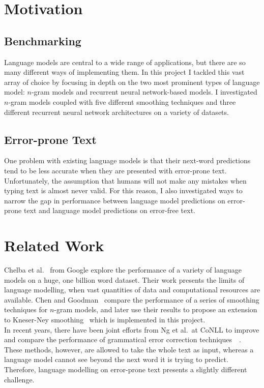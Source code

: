 \documentclass[a4paper, 12pt]{report}
\begin{document}
\section{Motivation}

\subsection*{Benchmarking}

Language models are central to a wide range of applications, but there are so many different ways of implementing them. In this project I tackled this vast array of choice by focusing in depth on the two most prominent types of language model: $n$-gram models and recurrent neural network-based models. I investigated $n$-gram models coupled with five different smoothing techniques and three different recurrent neural network architectures on a variety of datasets.

\subsection*{Error-prone Text}

One problem with existing language models is that their next-word predictions tend to be less accurate when they are presented with error-prone text. Unfortunately, the assumption that humans will not make any mistakes when typing text is almost never valid.  For this reason, I also investigated ways to narrow the gap in performance between language model predictions on error-prone text and language model predictions on error-free text. 

\section{Related Work}

Chelba et al.~\cite{1bw:chelba2013} from Google explore the performance of a variety of language models on a huge, one billion word dataset. Their work presents the limits of language modelling, when vast quantities of data and computational resources are available. Chen and Goodman~\cite{smoothing:chen1996} compare the performance of a series of smoothing techniques for $n$-gram models, and later use their results to propose an extension to Kneser-Ney smoothing~\cite{modified_kneser_ney:chen1999} which is implemented in this project. \\

In recent years, there have been joint efforts from Ng et al.\ at CoNLL to improve and compare the performance of grammatical error correction techniques~\cite{error_correction2013:ng2013}~\cite{error_correction2014:ng2014}. These methods, however, are allowed to take the whole text as input, whereas a language model cannot see beyond the next word it is trying to predict. Therefore, language modelling on error-prone text presents a slightly different challenge.
\end{document}

